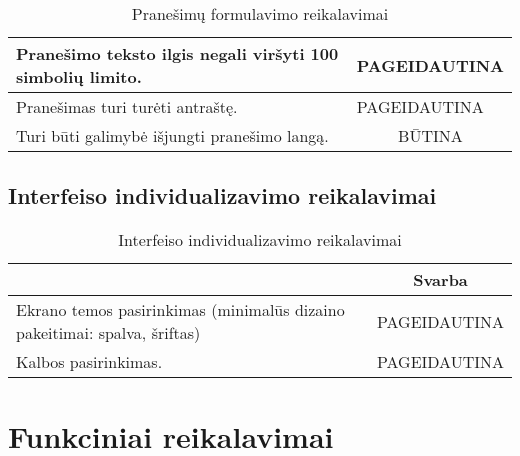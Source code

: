 \documentclass{VUMIFPSkursinis}
\begin{document}
\begin{center}
\begin{table}[H]
\begin{tabular}{|p{16cm}|p{2cm}|}
		\multicolumn{1}{|p{14,5cm}|}{Pranešimo teksto ilgis negali viršyti 100 simbolių limito.}& 
		\multicolumn{1}{|p{1.5cm}|}{PAGEIDAUTINA}\\
	\hline
	
		\multicolumn{1}{|p{14,5cm}|}{Pranešimas turi turėti antraštę.}& 
		\multicolumn{1}{|p{1.5cm}|}{PAGEIDAUTINA}\\
	\hline
	
		\multicolumn{1}{|p{14,5cm}|}{Turi būti galimybė išjungti pranešimo langą.}& 
		\multicolumn{1}{|c|}{BŪTINA}\\
	\hline	 	
	
	\end{tabular}
	\caption{Pranešimų formulavimo reikalavimai}
	\label{table:5}
	\end{table}

\end{center}

\pagebreak

\subsection{Interfeiso individualizavimo reikalavimai}

\begin{center}
	\begin{table}[H]
	\begin{tabular}{|p{16cm}|p{2cm}|}
	\hline
	    \rowcolor{lightgray}
		\multicolumn{1}{|c|}{ {\bfseries Užduotis}}&
		\multicolumn{1}{|c|}{{\bfseries Svarba}}\\		
	\hline
	
		\multicolumn{1}{|p{14,5cm}|}{Ekrano temos pasirinkimas (minimalūs dizaino pakeitimai: spalva, šriftas)}& 
		\multicolumn{1}{|p{1.5cm}|}{PAGEIDAUTINA}\\
	\hline
	
		\multicolumn{1}{|p{14,5cm}|}{Kalbos pasirinkimas.}& 
		\multicolumn{1}{|p{1.5cm}|}{PAGEIDAUTINA}\\
	\hline
	
	\end{tabular}
	\caption{Interfeiso individualizavimo reikalavimai}
	\label{table:6}	
	\end{table}
\end{center}

\section{Funkciniai reikalavimai}
\end{document}
